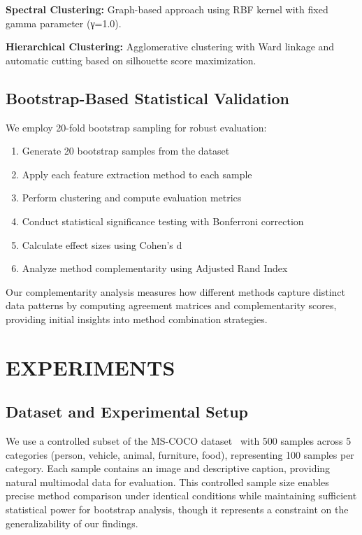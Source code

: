 \documentclass[sigconf]{acmart}
\begin{document}
\textbf{Spectral Clustering:} Graph-based approach using RBF kernel with fixed gamma parameter (γ=1.0).

\textbf{Hierarchical Clustering:} Agglomerative clustering with Ward linkage and automatic cutting based on silhouette score maximization.

\subsection{Bootstrap-Based Statistical Validation}

We employ 20-fold bootstrap sampling for robust evaluation:
\begin{enumerate}
\item Generate 20 bootstrap samples from the dataset
\item Apply each feature extraction method to each sample
\item Perform clustering and compute evaluation metrics
\item Conduct statistical significance testing with Bonferroni correction
\item Calculate effect sizes using Cohen's d
\item Analyze method complementarity using Adjusted Rand Index
\end{enumerate}

Our complementarity analysis measures how different methods capture distinct data patterns by computing agreement matrices and complementarity scores, providing initial insights into method combination strategies.

\section{EXPERIMENTS}

\subsection{Dataset and Experimental Setup}

We use a controlled subset of the MS-COCO dataset~\cite{lin2014microsoft} with 500 samples across 5 categories (person, vehicle, animal, furniture, food), representing 100 samples per category. Each sample contains an image and descriptive caption, providing natural multimodal data for evaluation. This controlled sample size enables precise method comparison under identical conditions while maintaining sufficient statistical power for bootstrap analysis, though it represents a constraint on the generalizability of our findings.
\end{document}
